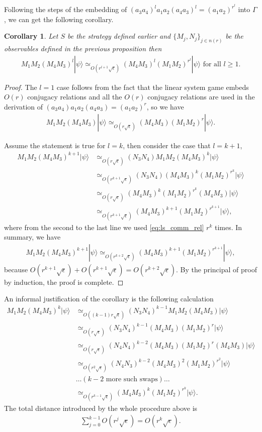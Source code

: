 \documentclass[11pt,letterpaper]{article}
\newcommand{\ket}[1]{|#1\rangle}
\newcommand{\1}{\mathbb{1}}
\newcommand{\nr}{n(r)}
\newcommand{\se}{\sqrt{\epsilon}}
\newcommand{\appd}[1]{\simeq_{#1}}
\newtheorem{corollary}[theorem]{Corollary}
\theoremstyle{definition}
\begin{document}
Following the steps of the embedding of $(a_3a_4)^l a_1a_2(a_4a_3)^l = (a_1a_2)^{r^l}$ into $\Gamma$,
we can get the following corollary.
\begin{corollary}
Let $S$ be the strategy defined earlier and $\{M_j, N_j\}_{j \in \nr}$ be the observables defined in the previous proposition then
\begin{align}
	M_1M_2 (M_4M_3)^l \ket{\psi}\appd{O(r^{l+1} \se)} (M_4M_3)^l (M_1M_2)^{r^l} \ket{\psi} \text{ for all } l \geq 1.
\end{align}
\end{corollary}
\begin{proof}
The $l = 1$ case follows from the fact that the linear system game embeds $O(r)$ conjugacy relations and 
all the $O(r)$ conjugacy relations are used in the derivation of $(a_3a_4)a_1a_2(a_4a_3) = (a_1a_2)^r$, so we 
have
\begin{align}
	\label{eq:ls_comm_rel}
	M_1M_2 (M_4M_3) \ket{\psi} \appd{O(r\se)} (M_4M_3)(M_1M_2)^r \ket{\psi}.
\end{align}

Assume the statement is true for $l = k$, then consider the case that $l = k+1$,
\begin{align}
	M_1M_2 (M_4M_3)^{k+1} \ket{\psi}  &\appd{O(r\se)} (N_3N_4) M_1M_2(M_4M_3)^k \ket{\psi} \\
	&\appd{O(r^{k+1}\se)} (N_3N_4) (M_4M_3)^k (M_1M_2)^{r^k} \ket{\psi}\\
	&\appd{O(r\se)} (M_4M_3)^k (M_1M_2)^{r^k} (M_4M_3) \ket{\psi} \\
	& \appd{O(r^{k+1} \se)} (M_4M_3)^{k+1} (M_1M_2)^{r^{k+1}} \ket{\psi},
\end{align}
where from the second to the last line we used \cref{eq:ls_comm_rel} $r^k$ times.
In summary, we have 
\begin{align}
	M_1M_2(M_4M_3)^{k+1} \ket{\psi} \appd{O(r^{k+2} \se)} (M_4M_3)^{k+1} (M_1M_2)^{r^{k+1}}\ket{\psi},
\end{align}
because $O(r^{k+1} \se)+O(r^{k+1}\se) = O(r^{k+2} \se)$.
By the principal of proof by induction, the proof is complete.
\end{proof}
An informal justification of the corollary is the following calculation
\begin{align}
	M_1M_2(M_4M_3)^k \ket{\psi} &\appd{O((k-1)r\se)} (N_3N_4)^{k-1} M_1M_2(M_4M_3) \ket{\psi} \\
	&\appd{O(r\se)} (N_3N_4)^{k-1}(M_4M_3) (M_1M_2)^r \ket{\psi} \\
	&\appd{O(r\se)} (N_4N_4)^{k-2} (M_4M_3) (M_1M_2)^{r} (M_4M_3) \ket{\psi}\\
	&\appd{O(r^2 \se)} (N_4N_3)^{k-2} (M_4M_3)^2 (M_1M_2)^{r^2} \ket{\psi} \\
	& \ldots (k-2  \text{ more such swaps} ) \ldots \\
	&\appd{O(r^{k-1}\se)} (M_4M_3)^{k} (M_1M_2)^{r^{k}}\ket{\psi}.
\end{align}
The total distance introduced by the whole procedure above is
\begin{align}
	\sum_{j=0}^{k-1} O(r^j \se) = O(r^k \se).
\end{align}
\end{document}
